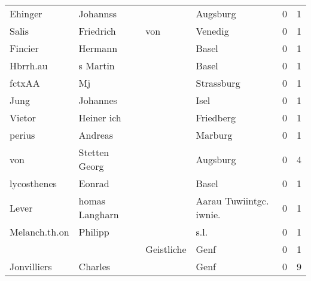 \begin{center}
\begin{tiny}
\begin{longtabu}{llllrr}
                  Ehinger &                           Johannss &             &                                    Augsburg &          0 &         1 \\
                    Salis &                          Friedrich &         von &                                     Venedig &          0 &         1 \\
                  Fincier &                            Hermann &             &                                       Basel &          0 &         1 \\
                 Hbrrh.au &                           s Martin &             &                                       Basel &          0 &         1 \\
                   fctxAA &                                 Mj &             &                                  Strassburg &          0 &         1 \\
                     Jung &                           Johannes &             &                                        Isel &          0 &         1 \\
                   Vietor &                         Heiner ich &             &                                   Friedberg &          0 &         1 \\
                   perius &                            Andreas &             &                                     Marburg &          0 &         1 \\
                      von &                      Stetten Georg &             &                                    Augsburg &          0 &         4 \\
              lycosthenes &                             Eonrad &             &                                       Basel &          0 &         1 \\
                    Lever &                     homas Langharn &             &                    Aarau Tuwiintgc. iwnie.  &          0 &         1 \\
            Melanch.th.on &                            Philipp &             &                                        s.l. &          0 &         1 \\
                          &                                    &  Geistliche &                                        Genf &          0 &         1 \\
              Jonvilliers &                            Charles &             &                                        Genf &          0 &         9 \\

\end{longtabu}
\end{tiny}
\end{center}
